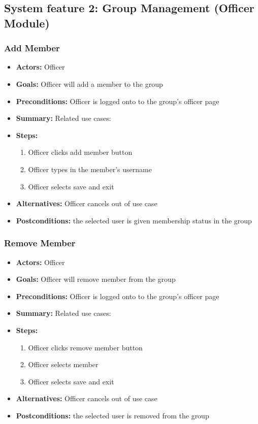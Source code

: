 \documentclass[12pt, oneside, letterpaper]{report}
\begin{document}
		\subsection{System feature 2: Group Management (Officer Module)}
			\subsubsection{Add Member}
			\begin{itemize}
				\item{\textbf{Actors:} Officer}
				\item{\textbf{Goals:} Officer will add a member to the group}
				\item{\textbf{Preconditions:} Officer is logged onto to the group's officer page}
				\item{\textbf{Summary:} Related use cases:}
				\item{\textbf{Steps:}
				\begin{enumerate}
					\item{Officer clicks add member button}
					\item{Officer types in the member's username}
					\item{Officer selects save and exit}
				\end{enumerate}
				}
				\item{\textbf{Alternatives:} Officer cancels out of use case}
				\item{\textbf{Postconditions:} the selected user is given membership status in the group}
			\end{itemize}
			\subsubsection{Remove Member}
			\begin{itemize}
				\item{\textbf{Actors:} Officer}
				\item{\textbf{Goals:} Officer will remove member from the group}
				\item{\textbf{Preconditions:} Officer is logged onto to the group's officer page}
				\item{\textbf{Summary:} Related use cases:}
				\item{\textbf{Steps:}
				\begin{enumerate}
					\item{Officer clicks remove member button}
					\item{Officer selects member}
					\item{Officer selects save and exit}
				\end{enumerate}
				}
				\item{\textbf{Alternatives:} Officer cancels out of use case}
				\item{\textbf{Postconditions:} the selected user is removed from the group}
			\end{itemize}
\end{document}
